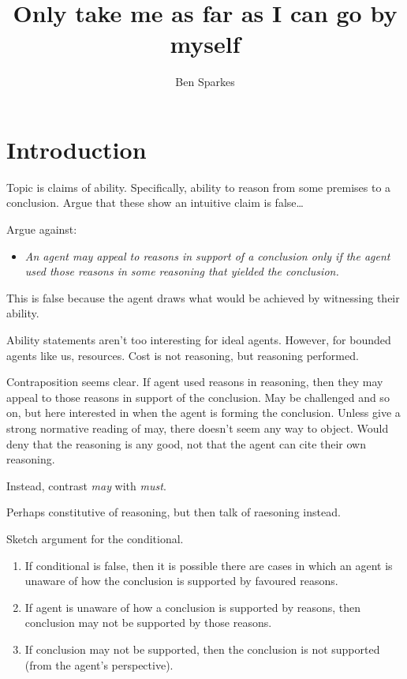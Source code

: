 \documentclass[10pt]{article}
\title{Only take me as far as I can go by myself}
\author{Ben Sparkes}
\begin{document}
\tableofcontents

\newpage

\maketitle

\section{Introduction}
\label{sec:introduction-1}


{
  \color{red}
  Topic is claims of ability.
  Specifically, ability to reason from some premises to a conclusion.
  Argue that these show an intuitive claim is false\dots
}

Argue against:
\begin{itemize}
\item\label{denied-claim} \emph{An agent may appeal to reasons in support of a conclusion only if the agent used those reasons in some reasoning that yielded the conclusion.}
\end{itemize}

{
  \color{red}
  This is false because the agent draws what would be achieved by witnessing their ability.
}

{
  \color{red}
  Ability statements aren't too interesting for ideal agents.
  However, for bounded agents like us, resources.
  Cost is not reasoning, but reasoning performed.
}

Contraposition seems clear.
If agent used reasons in reasoning, then they may appeal to those reasons in support of the conclusion.
May be challenged and so on, but here interested in when the agent is forming the conclusion.
Unless give a strong normative reading of may, there doesn't seem any way to object.
Would deny that the reasoning is any good, not that the agent can cite their own reasoning.

Instead, contrast \emph{may} with \emph{must}.

Perhaps constitutive of reasoning, but then talk of raesoning instead.

Sketch argument for the conditional.

\begin{enumerate}
\item\label{opp:sketch:1} If conditional is false, then it is possible there are cases in which an agent is unaware of how the conclusion is supported by favoured reasons.
\item\label{opp:sketch:2} If agent is unaware of how a conclusion is supported by reasons, then conclusion may not be supported by those reasons.
\item\label{opp:sketch:3} If conclusion may not be supported, then the conclusion is not supported (from the agent's perspective).
\end{enumerate}
\end{document}
